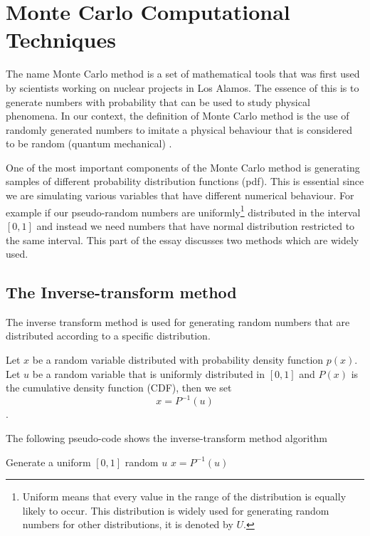 \chapter{Monte Carlo Computational Techniques}

The name Monte Carlo method is a set of mathematical tools that was first used by scientists working on nuclear projects in Los Alamos. The essence of this is to generate numbers with probability that can be used to study physical phenomena. In our context, the definition of Monte Carlo method is the use of randomly generated numbers to imitate a physical behaviour that is considered to be random (quantum mechanical) \citep{montecarlo}.


One of the most important components of the Monte Carlo method is generating samples of different probability distribution functions (pdf). This is essential since we are simulating various variables that have different numerical behaviour. For example if our pseudo-random numbers are uniformly\footnote{Uniform means that every value in the range of the distribution is equally likely to occur. This distribution is widely used for generating random numbers for other distributions, it is denoted by $U$.} distributed in the interval $[0,1]$  and instead we need numbers that have normal distribution restricted to the same interval. This part of the essay  discusses two methods which are widely used.


\section{The Inverse-transform method}

The inverse transform method is used for generating random numbers that are distributed according to a specific distribution. 

Let $x$ be a random variable distributed with probability density function $p(x)$. Let $u$ be a random variable that is uniformly distributed in $[0,1]$ and $P(x)$ is the cumulative density function (CDF), then we set 
\begin{equation}
x = P^{-1} (u)
\end{equation}\citep{Weinzierl}.

   
The following pseudo-code shows the inverse-transform method algorithm 
\begin{algorithmic}
\State Generate a uniform $[0,1]$ random $u$
\State \Return $x = P^{-1}(u)$
\end{algorithmic}

